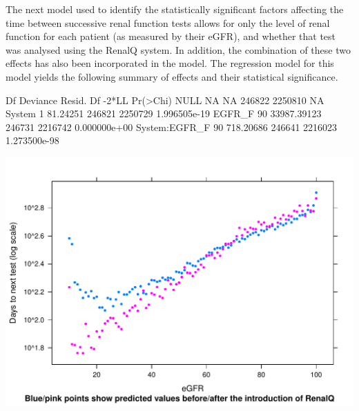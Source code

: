 



The next  model  used to identify the statistically significant factors affecting the time between successive renal function tests allows for only the level of renal function for each patient (as measured by their eGFR), and whether that test was analysed using the RenalQ system. In addition, the combination of these two effects has also been incorporated in the model. The regression model for this model yields  the following summary of effects and their statistical significance.
\begin{Schunk}
\begin{Soutput}
              Df    Deviance Resid. Df   -2*LL     Pr(>Chi)
NULL          NA          NA    246822 2250810           NA
System         1    81.24251    246821 2250729 1.996505e-19
EGFR_F        90 33987.39123    246731 2216742 0.000000e+00
System:EGFR_F 90   718.20686    246641 2216023 1.273500e-98
\end{Soutput}
\end{Schunk}


\includegraphics{Figures/RetestAll-ThePlots}

